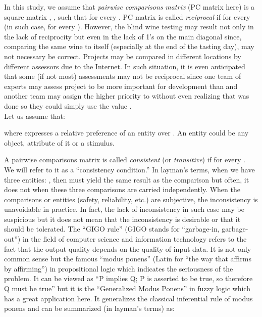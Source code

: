 \documentclass [12pt]{article}
\theoremstyle{definition}
\begin{document}
In this study, we assume that {\em pairwise comparisons} {\em matrix} (PC matrix here) is a square matrix , , such that  for every . PC matrix  is called {\em 
reciprocal} if  for every 
(in such case,  for every ). However, the blind wine testing may result not only in the lack of reciprocity but even in the lack of 1's on the main diagonal since, comparing the same wine to itself (especially at the end of the tasting day), may not necessary be correct. Projects may be compared in different locations by different assessors due to the Internet. In such situation, it is even anticipated that some (if not most) assessments may not be reciprocal since one team of experts may assess project  to be more important for development than  and another team may assign the higher priority to  without even realizing that  was done so they could simply use the value .
\\

Let us assume that:



\noindent where  expresses a relative preference of an entity  over . An entity could be any object, attribute of it or a stimulus.

A pairwise comparisons matrix  is called {\em consistent} (or {\em transitive}) if 
 for every . \\

We will refer to it as a ``consistency condition.'' In layman's terms, when we have three entities: , then  must yield the same result as the comparison  but often, it does not when these three comparisons are carried independently. When the comparisons or entities (safety, reliability, etc.) are subjective, the inconsistency is unavoidable in practice. In fact, the lack of inconsistency in such case may be suspicious but it does not mean that the inconsistency is desirable or that it should be tolerated. The ``GIGO rule'' (GIGO stands for ``garbage-in, garbage-out'')  in the field of computer science and information technology refers to the fact that the output quality depends on the quality of input data. It is not only common sense but the famous ``modus ponens'' (Latin for ``the way that affirms by affirming'') in propositional logic which indicates the seriousness of the problem. 
It can be viewed as ``P implies Q; P is asserted to be true, so therefore Q must be true'' but it is the ``Generalized Modus Ponens'' in fuzzy logic which has a great application here. It generalizes the classical inferential rule of modus ponens and can be summarized (in layman's terms) as:
\end{document}
